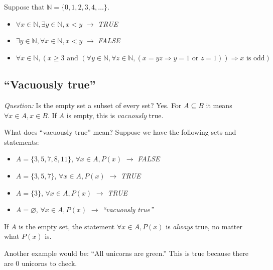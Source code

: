 \documentclass[11pt]{article}
\let\emptyset\varnothing
\begin{document}
    Suppose that \(\mathbb{N} = \{0,1,2,3,4,\dots\}\).
    \begin{itemize}
        \item \(\forall x \in \mathbb{N}, \exists y \in \mathbb{N}, x < y\) \(\rightarrow\) \emph{TRUE}
        \item \(\exists y \in \mathbb{N}, \forall x \in \mathbb{N}, x < y\) \(\rightarrow\) \emph{FALSE}
        \item \(\forall x \in \mathbb{N}, (x \geq 3 \text{ and } (\forall y \in \mathbb{N}, \forall z \in \mathbb{N}, (x = yz \Rightarrow y = 1 \text{ or } z = 1)) \Rightarrow \text{$x$ is odd})\)
    \end{itemize}

    \pagebreak

    \subsection{``Vacuously true''}

    \emph{Question:} Is the empty set a subset of every set? Yes. For \(A \subseteq B\) it means \(\forall x \in A, x \in B\). If $A$ is empty, this is \emph{vacuously} true.

    \vspace{1em}

    What does ``vacuously true'' mean? Suppose we have the following sets and statements:

    \begin{itemize}
        \item \(A = \{3,5,7,8,11\}\), \(\forall x \in A, P(x)\) \(\rightarrow\) \emph{FALSE}
        \item \(A = \{3,5,7\}\), \(\forall x \in A, P(x)\) \(\rightarrow\) \emph{TRUE}
        \item \(A = \{3\}\), \(\forall x \in A, P(x)\) \(\rightarrow\) \emph{TRUE}
        \item \(A = \emptyset\), \(\forall x \in A, P(x)\) \(\rightarrow\) \emph{``vacuously true''}
    \end{itemize}

    If $A$ is the empty set, the statement \(\forall x \in A, P(x)\) is \emph{always} true, no matter what \(P(x)\) is.

    \vspace{1em}

    Another example would be: ``All unicorns are green.'' This is true because there are 0 unicorns to check.
\end{document}

